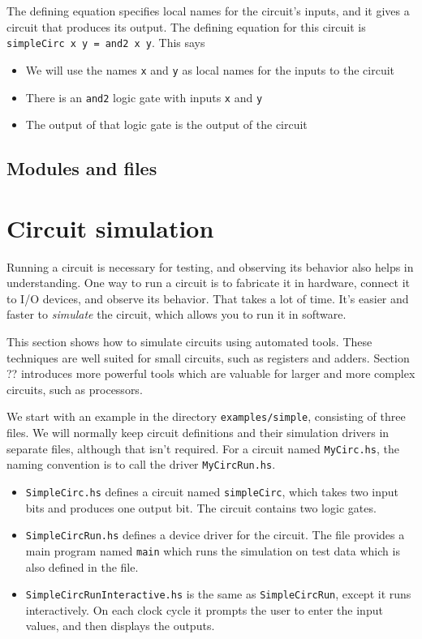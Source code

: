 \documentclass[]{svmono}
\begin{document}
The defining equation specifies local names for the circuit's inputs,
and it gives a circuit that produces its output.  The defining
equation for this circuit is \texttt{simpleCirc x y = and2 x y}.  This says
\begin{itemize}
\item We will use the names \texttt{x} and \texttt{y} as local names for the inputs to
the circuit
\item There is an \texttt{and2} logic gate with inputs \texttt{x} and \texttt{y}
\item The output of that logic gate is the output of the circuit
\end{itemize}
\subsection*{Modules and files}
\label{sec:orge8e9997}
\section*{Circuit simulation}
\label{sec:orge7f4634}

Running a circuit is necessary for testing, and observing its behavior
also helps in understanding.  One way to run a circuit is to fabricate
it in hardware, connect it to I/O devices, and observe its behavior.
That takes a lot of time.  It's easier and faster to \emph{simulate} the
circuit, which allows you to run it in software.

This section shows how to simulate circuits using automated tools.
These techniques are well suited for small circuits, such as registers
and adders.  Section ??  introduces more powerful tools which are
valuable for larger and more complex circuits, such as processors.

We start with an example in the directory \texttt{examples/simple},
consisting of three files.  We will normally keep circuit definitions
and their simulation drivers in separate files, although that isn't
required.  For a circuit named \texttt{MyCirc.hs}, the naming convention is
to call the driver \texttt{MyCircRun.hs}.

\begin{itemize}
\item \texttt{SimpleCirc.hs} defines a circuit named \texttt{simpleCirc}, which takes
two input bits  and  produces one output bit.  The circuit
contains two logic gates.

\item \texttt{SimpleCircRun.hs} defines a device driver for the circuit.  The
file provides a main program named \texttt{main} which runs the
simulation on test data which is also defined in the file.

\item \texttt{SimpleCircRunInteractive.hs} is the same as \texttt{SimpleCircRun}, except
it runs interactively.  On each clock cycle it prompts the user to
enter the input values, and then displays the outputs.
\end{itemize}
\end{document}
